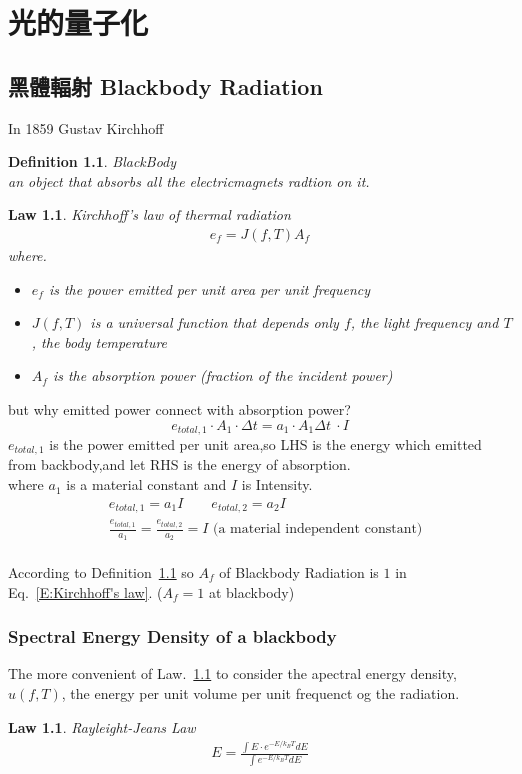 \documentclass[12pt,a4paper]{book}
\newtheorem{defn}[thm]{Definition}
\newtheorem{laws}[thm]{Law}
\begin{document}
	\chapter{光的量子化}
	\section{黑體輻射 Blackbody Radiation}
	In 1859 Gustav Kirchhoff 
	\begin{defn}\label{Def:BlackBody}
		BlackBody\\
		 an object that absorbs all the electricmagnets radtion on it.
	\end{defn}
	\begin{laws}\label{L:Kirchhoff's law of thermal radiation}
		Kirchhoff's law of thermal radiation\\
		\begin{align}e_f=J(f,T)A_f\label{E:Kirchhoff's law}\end{align}
	where.
	\begin{itemize}
		\item $e_f$ is the power emitted per unit area per unit frequency
		\item $J(f,T)$ is a universal function that depends only $f$, the light frequency and $T$, the body temperature
		\item $A_f$ is the absorption power (fraction of the incident power)
	\end{itemize}
	\end{laws}
	but why emitted power connect with absorption power?
	\[e_{total,1} \cdot A_1 \cdot \Delta t = a_1 \cdot A_1 \Delta t\ \cdot I\]
	$e_{total,1}$ is the power emitted per unit area,so LHS is the energy which emitted from backbody,and let RHS is the energy of absorption.\\
	where $a_1$ is a material constant and $I$ is Intensity.
	\begin{align*}
		&e_{total,1} = a_1I\qquad e_{total,2} = a_2I\\
		&\frac{e_{total,1}}{a_1}=\frac{e_{total,2}}{a_2}=I\mbox{ (a material independent constant)}
	\end{align*}
	\\
	According to Definition~\ref{Def:BlackBody} so $A_f$ of Blackbody Radiation is $1$ in Eq.~\ref{E:Kirchhoff's law}. ($A_f=1$ at blackbody)
	
		\subsection{Spectral Energy Density of a blackbody}
		The more convenient of Law.~\ref{L:Kirchhoff's law of thermal radiation} to consider
		the apectral energy density, $u(f,T)$, the energy per unit volume per unit frequenct og the radiation.
		\begin{laws}\label{L:Rayleight-Jeans Law}
			Rayleight-Jeans Law\\
			\begin{align}
			E=\frac{\int E \cdot e^{-E/k_BT}dE}{\int e^{-E/k_BT}dE}
			\end{align}
		\end{laws}
\end{document}
